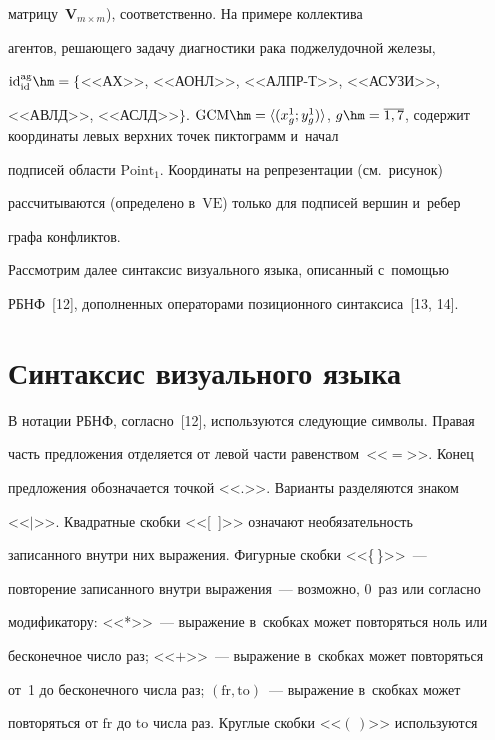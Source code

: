 матрицу~$\mathbf{V}_{m\times m}$), соответственно. На примере коллектива 

агентов, решающего задачу диагностики рака поджелудочной железы, 

$\mathrm{id}_{\mathrm{id}}^{\mathrm{ag}} \hm= \{$<<АХ>>, <<АОНЛ>>, <<АЛПР-Т>>, <<АСУЗИ>>, 

<<АВЛД>>, <<АСЛД>>$\}$. $\mathrm{GCM}\hm= \langle (x^1_g; y_g^1)\rangle$, $g\hm= 

\overline{1,7}$, содержит координаты левых верхних точек пиктограмм и~начал 

подписей области $\mathrm{Point}_1$. Координаты на репрезентации (см.\ рисунок) 

рассчитываются (определено в~$\mathrm{VE}$) только для подписей вершин и~ребер 

графа конфликтов.

  

  Рассмотрим далее синтаксис визуального языка, описанный с~по\-мощью 

\mbox{РБНФ}~[12], дополненных операторами позиционного синтаксиса~[13, 14].



\section{Синтаксис визуального языка}



  

  В нотации РБНФ, согласно~[12], используются следующие символы. Правая 

часть предложения отделяется от левой части равенством~<<$=$>>. Конец 

предложения обозначается точкой <<.>>. Варианты разделяются знаком 

<<$\vert$>>. Квадратные скобки <<[\ ]>> означают необязательность 

записанного внутри них выражения. Фигурные скобки <<\{\,\}>>~--- 

повторение записанного внутри выражения~--- возможно, 0~раз или согласно 

модификатору: <<*>>~--- выражение в~скобках может повторяться ноль или 

бесконечное число раз; <<$+$>>~--- выражение в~скобках может повторяться 

от~1 до бесконечного числа раз; $(\mathrm{fr},\mathrm{to})$~--- выражение в~скобках может 

повторяться от $\mathrm{fr}$ до $\mathrm{to}$ числа раз. Круглые скобки <<$(\,)$>> используются 

